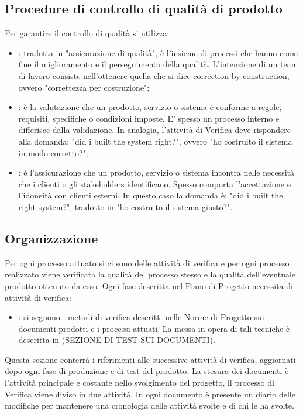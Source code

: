 \subsection{Procedure di controllo di qualità di prodotto} %
\label{2.4}
Per garantire il controllo di qualità si utilizza:
\begin{itemize}
\item {}: tradotta in "assicurazione di qualità", è l'insieme di processi che hanno come fine il miglioramento e il perseguimento della qualità. L'intenzione di un team di lavoro consiste nell'ottenere quella che si dice correction by construction, ovvero "correttezza per costruzione";
\item {}: è la valutazione che un prodotto, servizio o sistema è conforme a regole, requisiti, specifiche o condizioni imposte. E' spesso un processo interno e differisce dalla validazione. In analogia, l'attività di Verifica deve rispondere alla domanda: "did i built the system right?", ovvero "ho costruito il sistema in modo corretto?";
\item {}: è l'assicurazione che un prodotto, servizio o sistema incontra nelle necessità che i clienti o gli stakeholders identificano. Spesso comporta l'accettazione e l'idoneità con clienti esterni. In questo caso la domanda è: "did i built the right system?", tradotto in "ho costruito il sistema giusto?".
\end{itemize}

\subsection{Organizzazione} %
\label{2.5}
Per ogni processo attuato si ci sono delle attività di verifica e per ogni processo realizzato viene verificata la qualità del processo stesso e la qualità dell'eventuale prodotto ottenuto da esso.
Ogni fase descritta nel Piano di Progetto necessita di attività di verifica:
\begin{itemize}
\item {}: si seguono i metodi di verifica descritti nelle Norme di Progetto sui documenti prodotti e i processi attuati. La messa in opera di tali tecniche è descritta in (SEZIONE DI TEST SUI DOCUMENTI).
\end{itemize}
Questa sezione conterrà i riferimenti alle successive attività di verifica, aggiornati dopo ogni fase di produzione e di test del prodotto.
La stesura dei documenti è l'attività principale e costante nello svolgimento del progetto, il processo di Verifica viene diviso in due attività.
In ogni documento è presente un diario delle modifiche per mantenere una cronologia delle attività svolte e di chi le ha svolte.

